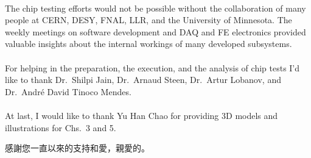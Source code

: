 \documentclass[a4paper, 12pt, twoside]{article}
\begin{document}
\\
The chip testing efforts would not be possible without the collaboration of many people at CERN, DESY, FNAL, LLR, and the University of Minnesota. The weekly meetings on software development and DAQ and FE electronics provided valuable insights about the internal workings of many developed subsystems.\\
\\
For helping in the preparation, the execution, and the analysis of chip tests I'd like to thank Dr.\ Shilpi Jain, Dr.\ Arnaud Steen, Dr.\ Artur Lobanov, and Dr.\ Andr\'e David Tinoco Mendes.\\
\\
At last, I would like to thank Yu Han Chao for providing 3D models and illustrations for Chs.~3 and 5.
\begin{CJK*}{UTF8}{bsmi}
感謝您一直以來的支持和愛，親愛的。
\clearpage\end{CJK*}
\end{document}
